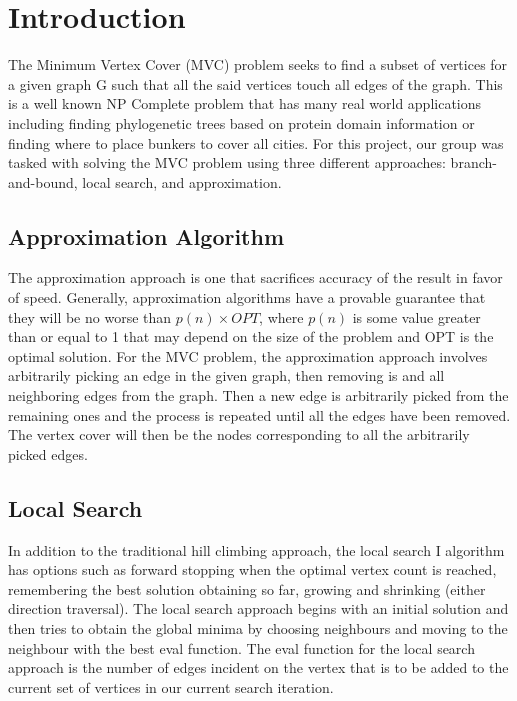 \section{Introduction}
The Minimum Vertex Cover (MVC) problem seeks to find a subset of vertices for a given graph G such that all the said vertices touch all edges of the graph. This is a well known NP Complete problem that has many real world applications including finding phylogenetic trees based on protein domain information \cite{abu2004kernelization} or finding where to place bunkers to cover all cities. For this project, our group was tasked with solving the MVC problem using three different approaches: branch-and-bound, local search, and approximation. 

\subsection{Approximation Algorithm}
The approximation approach is one that sacrifices accuracy of the result in favor of speed. Generally, approximation algorithms have a provable guarantee that they will be no worse than $p\left( n \right)\times OPT$, where $p\left( n \right)$ is some value greater than or equal to 1 that may depend on the size of the problem and OPT is the optimal solution. For the MVC problem, the approximation approach involves arbitrarily picking an edge in the given graph, then removing is and all neighboring edges from the graph. Then a new edge is arbitrarily picked from the remaining ones and the process is repeated until all the edges have been removed. The vertex cover will then be the nodes corresponding to all the arbitrarily picked edges.

\subsection{Local Search}
In addition to the traditional hill climbing approach, the local search I algorithm has options such as forward stopping when the optimal vertex count is reached, remembering the best solution obtaining so far, growing and shrinking (either direction traversal). The local search approach begins with an initial solution and then tries to obtain the global minima by choosing neighbours and moving to the neighbour with the best eval function. The eval function for the local search approach is the number of edges incident on the vertex that is to be added to the current set of vertices in our current search iteration.

